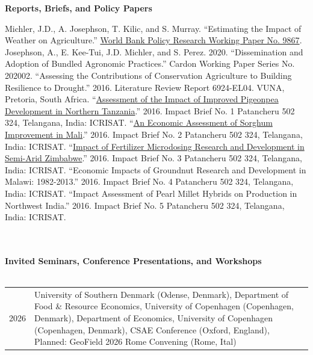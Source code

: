 \documentclass[letterpaper]{article}
\renewenvironment{itemize}{
  \begin{list}
  	{}{
    \setlength{\leftmargin}{1.5em}
    \setlength{\itemsep}{-.5em}
  }
}{
  \end{list}
}
\begin{document}
\begin{itemize}
\leftskip 0in
\item {\bf Reports, Briefs, and Policy Papers}

\leftskip 0.25in
\parindent -0.5in
\subitem Michler, J.D., A. Josephson, T. Kilic, and S. Murray. ``Estimating the Impact of Weather on Agriculture.'' \href{https://openknowledge.worldbank.org/handle/10986/36643}{World Bank Policy Research Working Paper No. 9867}.
\subitem Josephson, A., E. Kee-Tui, J.D. Michler, and S. Perez. 2020. ``Dissemination and Adoption of Bundled Agronomic Practices.'' Cardon Working Paper Series No. 202002.
\subitem ``Assessing the Contributions of Conservation Agriculture to Building Resilience to Drought.'' 2016. Literature Review Report 6924-EL04. VUNA, Pretoria, South Africa.
\subitem ``\href{http://www.icrisat.org/wp-content/uploads/Impact-Brief1_Pigeonpea-in-northern-Tanxzania-04Jul16_final-for-web.pdf}{Assessment of the Impact of Improved Pigeonpea Development in Northern Tanzania}.'' 2016. Impact Brief No. 1 Patancheru 502 324, Telangana, India: ICRISAT.
\subitem ``\href{http://www.icrisat.org/wp-content/uploads/Impact-Brief2_Sorghum-Improvement-in-Mali-04Jul16_final-for-web.pdf}{An Economic Assessment of Sorghum Improvement in Mali}.'' 2016. Impact Brief No. 2 Patancheru 502 324, Telangana, India: ICRISAT.
\subitem ``\href{http://www.icrisat.org/wp-content/uploads/Impact-Brief3_Fertilizer-Microdosing-RD-Zimbabwe-04Jul16_final-for-web.pdf}{Impact of Fertilizer Microdosing Research and Development in Semi-Arid Zimbabwe}.''  2016. Impact Brief No. 3 Patancheru 502 324, Telangana, India: ICRISAT.
\subitem ``Economic Impacts of Groundnut Research and Development in Malawi: 1982-2013.'' 2016. Impact Brief No. 4 Patancheru 502 324, Telangana, India: ICRISAT.
\subitem ``Impact Assessment of Pearl Millet Hybrids on Production in Northwest India.''  2016. Impact Brief No. 5 Patancheru 502 324, Telangana, India: ICRISAT. \\
\\
\\
\leftskip 0in
\item {\bf Invited Seminars, Conference Presentations, and Workshops} \\
\\
\begin{tabular}{lp{.92\linewidth}}
    2026    & University of Southern Denmark (Odense, Denmark), Department of Food \& Resource Economics, University of Copenhagen (Copenhagen, Denmark), Department of Economics, University of Copenhagen (Copenhagen, Denmark), CSAE Conference (Oxford, England), Planned: GeoField 2026 Rome Convening (Rome, Ital)  \\

\end{tabular}
\end{itemize}
\end{document}
